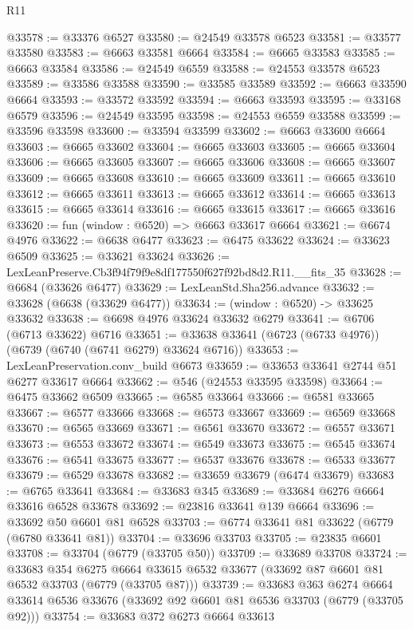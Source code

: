 \begin{lexlean}{R11}
\begin{coremodule}
@33578 := @33376 @6527
@33580 := @24549 @33578 @6523
@33581 := @33577 @33580
@33583 := @6663 @33581 @6664
@33584 := @6665 @33583
@33585 := @6663 @33584
@33586 := @24549 @6559
@33588 := @24553 @33578 @6523
@33589 := @33586 @33588
@33590 := @33585 @33589
@33592 := @6663 @33590 @6664
@33593 := @33572 @33592
@33594 := @6663 @33593
@33595 := @33168 @6579
@33596 := @24549 @33595
@33598 := @24553 @6559 @33588
@33599 := @33596 @33598
@33600 := @33594 @33599
@33602 := @6663 @33600 @6664
@33603 := @6665 @33602
@33604 := @6665 @33603
@33605 := @6665 @33604
@33606 := @6665 @33605
@33607 := @6665 @33606
@33608 := @6665 @33607
@33609 := @6665 @33608
@33610 := @6665 @33609
@33611 := @6665 @33610
@33612 := @6665 @33611
@33613 := @6665 @33612
@33614 := @6665 @33613
@33615 := @6665 @33614
@33616 := @6665 @33615
@33617 := @6665 @33616
@33620 := fun (window : @6520) => @6663 @33617 @6664
@33621 := @6674 @4976
@33622 := @6638 @6477
@33623 := @6475 @33622
@33624 := @33623 @6509
@33625 := @33621 @33624
@33626 := LexLeanPreserve.Cb3f94f79f9e8df177550f627f92bd8d2.R11.__fits_35
@33628 := @6684 (@33626 @6477)
@33629 := LexLeanStd.Sha256.advance
@33632 := @33628 (@6638 (@33629 @6477))
@33634 := (window : @6520) -> @33625 @33632
@33638 := @6698 @4976 @33624 @33632 @6279
@33641 := @6706 (@6713 @33622) @6716
@33651 := @33638 @33641 (@6723 (@6733 @4976)) (@6739 (@6740 (@6741 @6279) @33624 @6716))
@33653 := LexLeanPreservation.conv_build @6673
@33659 := @33653 @33641 @2744 @51 @6277 @33617 @6664
@33662 := @546 (@24553 @33595 @33598)
@33664 := @6475 @33662 @6509
@33665 := @6585 @33664
@33666 := @6581 @33665
@33667 := @6577 @33666
@33668 := @6573 @33667
@33669 := @6569 @33668
@33670 := @6565 @33669
@33671 := @6561 @33670
@33672 := @6557 @33671
@33673 := @6553 @33672
@33674 := @6549 @33673
@33675 := @6545 @33674
@33676 := @6541 @33675
@33677 := @6537 @33676
@33678 := @6533 @33677
@33679 := @6529 @33678
@33682 := @33659 @33679 (@6474 @33679)
@33683 := @6765 @33641
@33684 := @33683 @345
@33689 := @33684 @6276 @6664 @33616 @6528 @33678
@33692 := @23816 @33641 @139 @6664
@33696 := @33692 @50 @6601 @81 @6528
@33703 := @6774 @33641 @81 @33622 (@6779 (@6780 @33641 @81))
@33704 := @33696 @33703
@33705 := @23835 @6601
@33708 := @33704 (@6779 (@33705 @50))
@33709 := @33689 @33708
@33724 := @33683
    @354
    @6275
    @6664
    @33615
    @6532
    @33677
    (@33692 @87 @6601 @81 @6532 @33703 (@6779 (@33705 @87)))
@33739 := @33683
    @363
    @6274
    @6664
    @33614
    @6536
    @33676
    (@33692 @92 @6601 @81 @6536 @33703 (@6779 (@33705 @92)))
@33754 := @33683
    @372
    @6273
    @6664
    @33613

\end{coremodule}
\end{lexlean}
